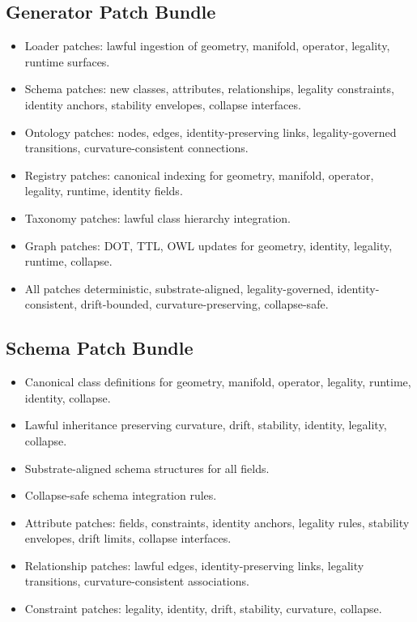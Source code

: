 \subsection{Generator Patch Bundle}
\begin{itemize}
    \item Loader patches: lawful ingestion of geometry, manifold, operator, legality, runtime surfaces.
    \item Schema patches: new classes, attributes, relationships, legality constraints, identity anchors, stability envelopes, collapse interfaces.
    \item Ontology patches: nodes, edges, identity-preserving links, legality-governed transitions, curvature-consistent connections.
    \item Registry patches: canonical indexing for geometry, manifold, operator, legality, runtime, identity fields.
    \item Taxonomy patches: lawful class hierarchy integration.
    \item Graph patches: DOT, TTL, OWL updates for geometry, identity, legality, runtime, collapse.
    \item All patches deterministic, substrate-aligned, legality-governed, identity-consistent, drift-bounded, curvature-preserving, collapse-safe.
\end{itemize}

\subsection{Schema Patch Bundle}
\begin{itemize}
    \item Canonical class definitions for geometry, manifold, operator, legality, runtime, identity, collapse.
    \item Lawful inheritance preserving curvature, drift, stability, identity, legality, collapse.
    \item Substrate-aligned schema structures for all fields.
    \item Collapse-safe schema integration rules.
    \item Attribute patches: fields, constraints, identity anchors, legality rules, stability envelopes, drift limits, collapse interfaces.
    \item Relationship patches: lawful edges, identity-preserving links, legality transitions, curvature-consistent associations.
    \item Constraint patches: legality, identity, drift, stability, curvature, collapse.
\end{itemize}


